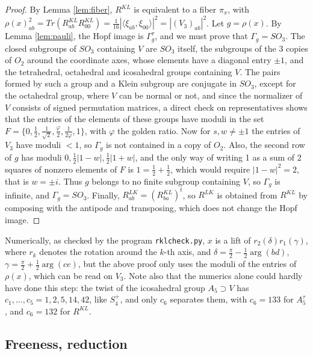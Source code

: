 \documentclass[11pt]{amsart}
\begin{document}
\begin{proof}
By Lemma \ref{lem:fiber}, $R^{KL}$ is equivalent to a fiber $\pi_x$, with $\rho(x)_{ab}^2=Tr(R^{KL}_{ab}R^{KL}_{00})=\frac{1}{16}|\langle\xi_{ab},\xi_{00}\rangle|^2=|(V_3)_{ab}|^2$. Let $g=\rho(x)$. By Lemma \ref{lem:pauli}, the Hopf image is $\Gamma_g^\tau$, and we must prove that $\Gamma_g=SO_3$. The closed subgroups of $SO_3$ containing $V$ are $SO_3$ itself, the subgroups of the 3 copies of $O_2$ around the coordinate axes, whose elements have a diagonal entry $\pm1$, and the tetrahedral, octahedral and icosahedral groups containing $V$. The pairs formed by such a group and a Klein subgroup are conjugate in $SO_3$, except for the octahedral group, where $V$ can be normal or not, and since the normalizer of $V$ consists of signed permutation matrices, a direct check on representatives shows that the entries of the elements of these groups have moduli in the set $F=\{0,\frac{1}{2},\frac{1}{\sqrt2},\frac{\varphi}{2},\frac{1}{2\varphi},1\}$, with $\varphi$ the golden ratio. Now for $s,w\neq\pm1$ the entries of $V_3$ have moduli $<1$, so $\Gamma_g$ is not contained in a copy of $O_2$. Also, the second row of $g$ has moduli $0,\frac{1}{2}|1-w|,\frac{1}{2}|1+w|$, and the only way of writing 1 as a sum of 2 squares of nonzero elements of $F$ is $1=\frac{1}{2}+\frac{1}{2}$, which would require $|1-w|^2=2$, that is $w=\pm i$. Thus $g$ belongs to no finite subgroup containing $V$, so $\Gamma_g$ is infinite, and $\Gamma_g=SO_3$. Finally, $R^{LK}_{ab}=(R^{KL}_{ba})^t$, so $R^{LK}$ is obtained from $R^{KL}$ by composing with the antipode and transposing, which does not change the Hopf image.
\end{proof}

\noindent Numerically, as checked by the program \texttt{rklcheck.py}, $x$ is a lift of $r_2(\delta)r_1(\gamma)$, where $r_k$ denotes the rotation around the $k$-th axis, and $\delta=\frac{\pi}{2}-\frac{1}{2}\arg(bd)$, $\gamma=\frac{\pi}{2}+\frac{1}{2}\arg(ce)$, but the above proof only uses the moduli of the entries of $\rho(x)$, which can be read on $V_3$. Note also that the numerics alone could hardly have done this step: the twist of the icosahedral group $A_5\supset V$ has $c_1,\ldots,c_5=1,2,5,14,42$, like $S_4^+$, and only $c_6$ separates them, with $c_6=133$ for $A_5^\tau$, and $c_6=132$ for $R^{KL}$.

\medskip

\subsection{Freeness, reduction}
\end{document}
